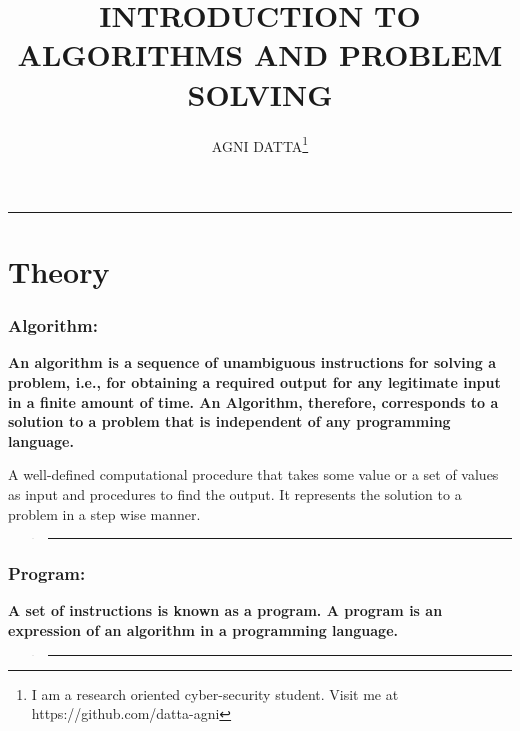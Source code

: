 \documentclass[british]{article}
\begin{document}
\title{\textbf{\huge{}INTRODUCTION TO ALGORITHMS AND PROBLEM SOLVING}}
\author{AGNI DATTA\thanks{I am a research oriented cyber-security student. Visit me at https://github.com/datta-agni}}
\maketitle
\begin{center}
	\rule[0.5ex]{0.5\columnwidth}{0.5pt}
	\par\end{center}

\vfill{}

\pagebreak{}

\tableofcontents{}

\vfill{}

\pagebreak{}

\part{Theory}

\section{Algorithm:}

\textbf{An algorithm is a sequence of unambiguous instructions for
	solving a problem, i.e., for obtaining a required output for any legitimate
	input in a finite amount of time. An Algorithm, therefore, corresponds
	to a solution to a problem that is independent of any programming
	language.}

A well-defined computational procedure that takes some value or a
set of values as input and procedures to find the output. It represents
the solution to a problem in a step wise manner.
\begin{verse}
	\rule[0.5ex]{1\columnwidth}{1pt}
\end{verse}

\section{Program:}

\textbf{A set of instructions is known as a program. A program is
	an expression of an algorithm in a programming language.}
\begin{verse}
	\rule[0.5ex]{1\columnwidth}{1pt}
\end{verse}
\end{document}
